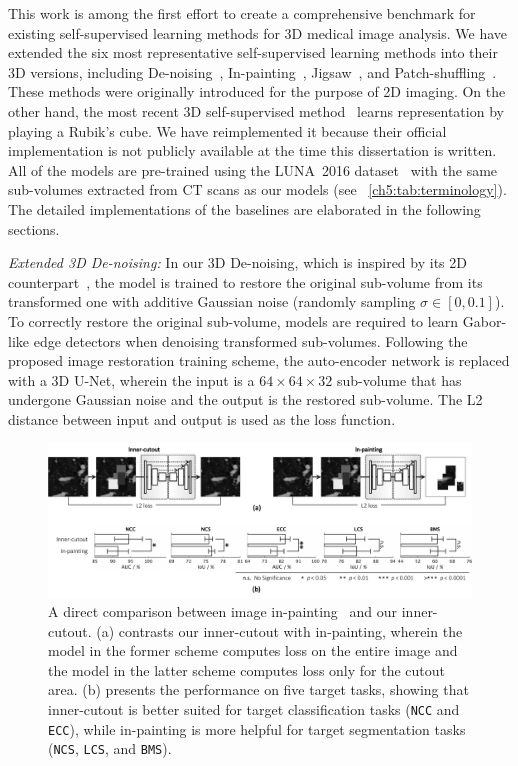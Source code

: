 This work is among the first effort to create a comprehensive benchmark for existing self-supervised learning methods for 3D medical image analysis. We have extended the six most representative self-supervised learning methods into their 3D versions, including De-noising~\citep{vincent2010stacked}, In-painting~\citep{pathak2016context}, Jigsaw~\citep{noroozi2016unsupervised}, and Patch-shuffling~\citep{chen2019self}. These methods were originally introduced for the purpose of 2D imaging. 
On the other hand, the most recent 3D self-supervised method~\citep{zhuang2019self} learns representation by playing a Rubik's cube.
We have reimplemented it because their official implementation is not publicly available at the time this dissertation is written. All of the models are pre-trained using the LUNA~2016 dataset~\citep{setio2017validation} with the same sub-volumes extracted from CT scans as our models (see \tablename~\ref{ch5:tab:terminology}). The detailed implementations of the baselines are elaborated in the following sections.

\textit{Extended 3D De-noising:} In our 3D De-noising, which is inspired by its 2D counterpart~\citep{vincent2010stacked}, the model is trained to restore the original sub-volume from its transformed one with additive Gaussian noise (randomly sampling $\sigma\in[0,0.1]$). To correctly restore the original sub-volume, models are required to learn Gabor-like edge detectors when denoising transformed sub-volumes. Following the proposed image restoration training scheme, the auto-encoder network is replaced with a 3D U-Net, wherein the input is a $64\times 64\times 32$ sub-volume that has undergone Gaussian noise and the output is the restored sub-volume. The L2 distance between input and output is used as the loss function. 

\begin{figure}[t]
\begin{center}
\includegraphics[width=1.0\linewidth]{Figures/AP2/fig_innercutout_inpainting.pdf}
\end{center}
\caption[Comparison Between Image In-painting and Inner-cutout]{
A direct comparison between image in-painting~\citep{pathak2016context} and our inner-cutout. (a) contrasts our inner-cutout with in-painting, wherein the model in the former scheme computes loss on the entire image and the model in the latter scheme computes loss only for the cutout area. (b) presents the performance on five target tasks, showing that inner-cutout is better suited for target classification tasks (\eg \texttt{NCC} and \texttt{ECC}), while in-painting is more helpful for target segmentation tasks (\eg \texttt{NCS}, \texttt{LCS}, and \texttt{BMS}).
}
\label{ap2:fig:innercutout_inpainting}
\end{figure}

